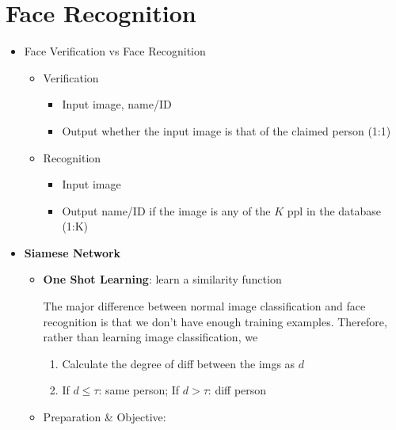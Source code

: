 \documentclass[
]{book}
\providecommand{\tightlist}{%
  \setlength{\itemsep}{0pt}\setlength{\parskip}{0pt}}
\begin{document}
\hypertarget{face-recognition}{%
\section{Face Recognition}\label{face-recognition}}

\begin{itemize}
\item
  Face Verification vs Face Recognition

  \begin{itemize}
  \tightlist
  \item
    Verification

    \begin{itemize}
    \tightlist
    \item
      Input image, name/ID
    \item
      Output whether the input image is that of the claimed person (1:1)
    \end{itemize}
  \item
    Recognition

    \begin{itemize}
    \tightlist
    \item
      Input image
    \item
      Output name/ID if the image is any of the \(K\) ppl in the
      database (1:K)\\
    \end{itemize}
  \end{itemize}
\item
  \textbf{Siamese Network}

  \begin{itemize}
  \item
    \textbf{One Shot Learning}: learn a similarity function

    The major difference between normal image classification and face
    recognition is that we don't have enough training examples.
    Therefore, rather than learning image classification, we

    \begin{enumerate}
    \def\labelenumi{\arabic{enumi}.}
    \tightlist
    \item
      Calculate the degree of diff between the imgs as \(d\)
    \item
      If \(d\leq\tau\): same person; If \(d>\tau\): diff person\\
    \end{enumerate}
  \item
    Preparation \& Objective:


\end{itemize}
\end{itemize}
\end{document}
